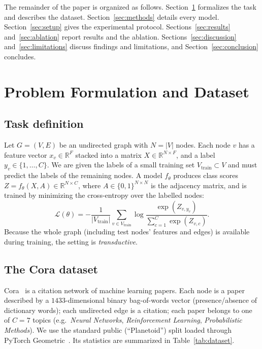 \documentclass{article}
\begin{document}
The remainder of the paper is organized as follows.
Section~\ref{sec:problem} formalizes the task and describes the dataset.
Section~\ref{sec:methods} details every model.
Section~\ref{sec:setup} gives the experimental protocol.
Sections~\ref{sec:results} and~\ref{sec:ablation} report results and the ablation.
Sections~\ref{sec:discussion} and~\ref{sec:limitations} discuss findings and
limitations, and Section~\ref{sec:conclusion} concludes.

\section{Problem Formulation and Dataset}
\label{sec:problem}

\subsection{Task definition}
Let $G = (V, E)$ be an undirected graph with $N = |V|$ nodes. Each node $v$ has a
feature vector $x_v \in \mathbb{R}^{F}$ stacked into a matrix
$X \in \mathbb{R}^{N \times F}$, and a label $y_v \in \{1,\dots,C\}$. We are given the
labels of a small training set $V_{\text{train}} \subset V$ and must predict the
labels of the remaining nodes. A model $f_\theta$ produces class scores
$Z = f_\theta(X, A) \in \mathbb{R}^{N \times C}$, where $A \in \{0,1\}^{N \times N}$
is the adjacency matrix, and is trained by minimizing the cross-entropy over the
labelled nodes:
\begin{equation}
  \mathcal{L}(\theta) = -\frac{1}{|V_{\text{train}}|}
  \sum_{v \in V_{\text{train}}} \log \frac{\exp(Z_{v,y_v})}{\sum_{c=1}^{C}\exp(Z_{v,c})}.
  \label{eq:loss}
\end{equation}
Because the whole graph (including test nodes' features and edges) is available
during training, the setting is \emph{transductive}.

\subsection{The Cora dataset}
Cora~\cite{sen2008collective,yang2016planetoid} is a citation network of machine
learning papers. Each node is a paper described by a $1433$-dimensional binary
bag-of-words vector (presence/absence of dictionary words); each undirected edge is a
citation; each paper belongs to one of $C=7$ topics (e.g.\ \emph{Neural Networks},
\emph{Reinforcement Learning}, \emph{Probabilistic Methods}). We use the standard
public (``Planetoid'') split loaded through PyTorch Geometric~\cite{fey2019pyg}. Its
statistics are summarized in Table~\ref{tab:dataset}.
\end{document}
